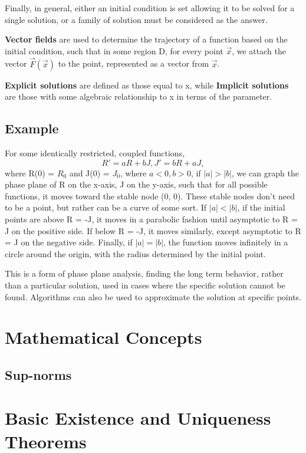 \documentclass[11 pt, twoside]{article}
\begin{document}
Finally, in general, either an initial condition is set allowing it to be solved for a single solution, or a family of solution must be considered as the answer.

\textbf{Vector fields} are used to determine the trajectory of a function based on the initial condition, such that in some region D, for every point $\vec{x}$, we attach the vector $\vec{F}(\vec{x})$ to the point, represented as a vector from $\vec{x}$.

\textbf{Explicit solutions} are defined as those equal to x, while \textbf{Implicit solutions} are those with some algebraic relationship to x in terms of the parameter.

\subsection{Example}

For some identically restricted, coupled functions, $$R' = aR + bJ, J' = bR + aJ,$$ where R(0) = $R_0$ and J(0) = $J_0$, where $a < 0, b > 0$, if $|a| > |b|$, we can graph the phase plane of R on the x-axis, J on the y-axis, such that for all possible functions, it moves toward the stable node (0, 0). These stable nodes don't need to be a point, but rather can be a curve of some sort. If $|a| < |b|$, if the initial points are above R = -J, it moves in a parabolic fashion until asymptotic to R = J on the positive side. If below R = -J, it moves similarly, except asymptotic to R = J on the negative side. Finally, if $|a| = |b|$, the function moves infinitely in a circle around the origin, with the radius determined by the initial point.

This is a form of phase plane analysis, finding the long term behavior, rather than a particular solution, used in cases where the specific solution cannot be found. Algorithms can also be used to approximate the solution at specific points.

\section{Mathematical Concepts}
\subsection{Sup-norms}
\section{Basic Existence and Uniqueness Theorems}
\end{document}
